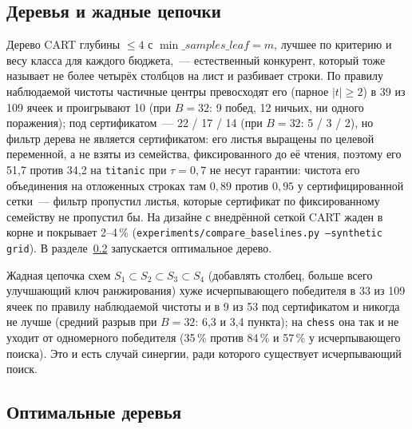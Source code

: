 \documentclass[11pt]{article}
\begin{document}
\subsection{Деревья и жадные цепочки}\label{sec:trees}
Дерево CART глубины $\le4$ с $\min\_samples\_leaf=m$, лучшее по критерию и весу класса для каждого бюджета,~--- естественный конкурент, который тоже называет не более четырёх столбцов на лист и разбивает строки. По правилу наблюдаемой чистоты частичные центры превосходят его (парное $|t|\ge2$) в 39 из 109 ячеек и проигрывают 10 (при $B=32$: 9 побед, 12 ничьих, ни одного поражения); под сертификатом~--- 22 / 17 / 14 (при $B=32$: 5 / 3 / 2), но фильтр дерева не является сертификатом: его листья выращены по целевой переменной, а не взяты из семейства, фиксированного до её чтения, поэтому его 51,7 против 34,2 на \texttt{titanic} при $\tau=0{,}7$ не несут гарантии: чистота его объединения на отложенных строках там $0{,}89$ против $0{,}95$ у сертифицированной сетки~--- фильтр пропустил листья, которые сертификат по фиксированному семейству не пропустил бы. На дизайне с внедрённой сеткой CART жаден в корне и покрывает 2--4\,\% (\texttt{experiments/compare\_baselines.py --synthetic grid}). В разделе~\ref{sec:treeopt} запускается оптимальное дерево.

Жадная цепочка схем $S_1\subset S_2\subset S_3\subset S_4$ (добавлять столбец, больше всего улучшающий ключ ранжирования) хуже исчерпывающего победителя в 33 из 109 ячеек по правилу наблюдаемой чистоты и в 9 из 53 под сертификатом и никогда не лучше (средний разрыв при $B=32$: 6,3 и 3,4 пункта); на \texttt{chess} она так и не уходит от одномерного победителя (35\,\% против 84\,\% и 57\,\% у исчерпывающего поиска). Это и есть случай синергии, ради которого существует исчерпывающий поиск.

\subsection{Оптимальные деревья}\label{sec:treeopt}
\end{document}
